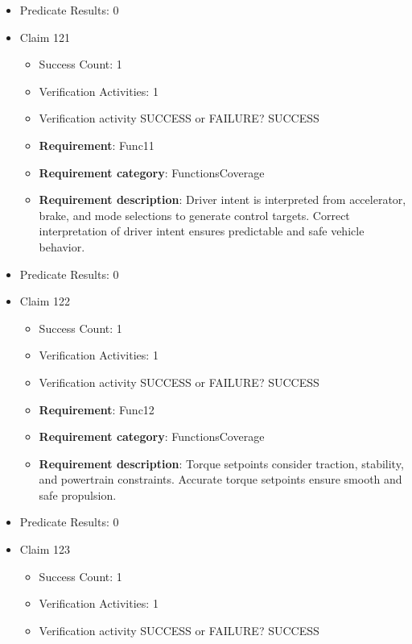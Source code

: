 \documentclass{article}
\begin{document}
\begin{itemize}
\begin{itemize}
				\end{itemize}
				
									    
				\item Predicate Results: 0

  				  \item Claim 121
				\begin{itemize}
			    	\item Success Count: 1 
			    	\item Verification Activities: 1
					\item Verification activity SUCCESS or FAILURE? SUCCESS
		
						\item \textbf{Requirement}: Func11 
						\item \textbf{Requirement category}: FunctionsCoverage 
						\item \textbf{Requirement description}: Driver intent is interpreted from accelerator, brake, and mode selections to generate control targets. Correct interpretation of driver intent ensures predictable and safe vehicle behavior.
					
				\end{itemize}
				
									    
				\item Predicate Results: 0

  				  \item Claim 122
				\begin{itemize}
			    	\item Success Count: 1 
			    	\item Verification Activities: 1
					\item Verification activity SUCCESS or FAILURE? SUCCESS
		
						\item \textbf{Requirement}: Func12 
						\item \textbf{Requirement category}: FunctionsCoverage 
						\item \textbf{Requirement description}: Torque setpoints consider traction, stability, and powertrain constraints. Accurate torque setpoints ensure smooth and safe propulsion.
					
				\end{itemize}
				
									    
				\item Predicate Results: 0

  				  \item Claim 123
				\begin{itemize}
			    	\item Success Count: 1 
			    	\item Verification Activities: 1
					\item Verification activity SUCCESS or FAILURE? SUCCESS
		

\end{itemize}
\end{itemize}
\end{document}

